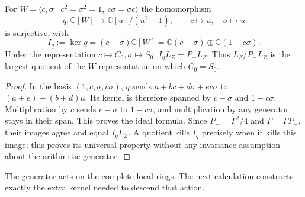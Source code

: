 \begin{proposition}
\label{prop:ghost-group-quotient}
For $W=\langle c,\sigma\mid c^2=\sigma^2=1,\ c\sigma=\sigma c\rangle$
the homomorphism
\[
 q:\mathbb C[W]\longrightarrow\mathbb C[u]/(u^2-1),\qquad
 c\longmapsto u,\quad\sigma\longmapsto u
\]
is surjective, with
\[
 I_q:=\ker q=(c-\sigma)\mathbb C[W]
  =\mathbb C(c-\sigma)\oplus\mathbb C(1-c\sigma).
\]
Under the representation $c\mapsto C_0,\sigma\mapsto S_0$,
$I_qL_Z=P_-L_Z$.  Thus $L_Z/P_-L_Z$ is the largest quotient of the
$W$-representation on which $C_0=S_0$.
\end{proposition}
\begin{proof}
In the basis $(1,c,\sigma,c\sigma)$, $q$ sends
$a+bc+d\sigma+ec\sigma$ to $(a+e)+(b+d)u$.  Its kernel is therefore
spanned by $c-\sigma$ and $1-c\sigma$.  Multiplication by $c$ sends
$c-\sigma$ to $1-c\sigma$, and multiplication by any generator stays
in their span.  This proves the ideal formula.  Since
$P_-=\Gamma^2/4$ and $\Gamma=\Gamma P_-$, their images agree and equal
$I_qL_Z$.  A quotient kills $I_q$ precisely when it kills this image;
this proves its universal property without any invariance assumption
about the arithmetic generator.
\end{proof}

The generator acts on the complete local rings.  The next calculation
constructs exactly the extra kernel needed to descend that action.

